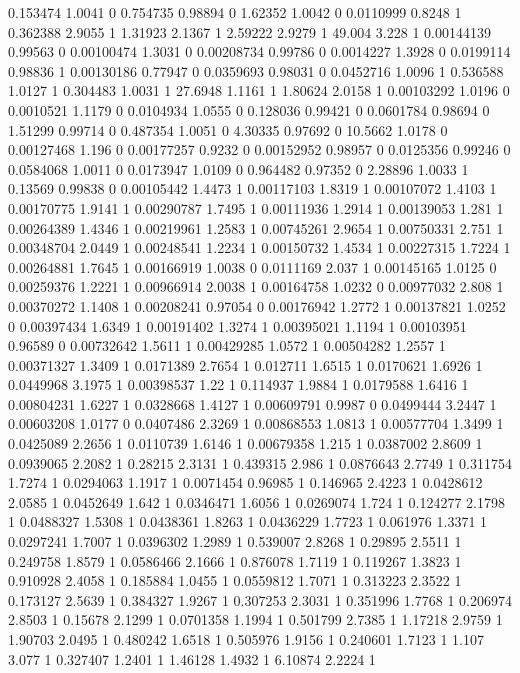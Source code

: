 {0.153474 1.0041 0
0.754735 0.98894 0
1.62352 1.0042 0
0.0110999 0.8248 1
0.362388 2.9055 1
1.31923 2.1367 1
2.59222 2.9279 1
49.004 3.228 1
0.00144139 0.99563 0
0.00100474 1.3031 0
0.00208734 0.99786 0
0.0014227 1.3928 0
0.0199114 0.98836 1
0.00130186 0.77947 0
0.0359693 0.98031 0
0.0452716 1.0096 1
0.536588 1.0127 1
0.304483 1.0031 1
27.6948 1.1161 1
1.80624 2.0158 1
0.00103292 1.0196 0
0.0010521 1.1179 0
0.0104934 1.0555 0
0.128036 0.99421 0
0.0601784 0.98694 0
1.51299 0.99714 0
0.487354 1.0051 0
4.30335 0.97692 0
10.5662 1.0178 0
0.00127468 1.196 0
0.00177257 0.9232 0
0.00152952 0.98957 0
0.0125356 0.99246 0
0.0584068 1.0011 0
0.0173947 1.0109 0
0.964482 0.97352 0
2.28896 1.0033 1
0.13569 0.99838 0
0.00105442 1.4473 1
0.00117103 1.8319 1
0.00107072 1.4103 1
0.00170775 1.9141 1
0.00290787 1.7495 1
0.00111936 1.2914 1
0.00139053 1.281 1
0.00264389 1.4346 1
0.00219961 1.2583 1
0.00745261 2.9654 1
0.00750331 2.751 1
0.00348704 2.0449 1
0.00248541 1.2234 1
0.00150732 1.4534 1
0.00227315 1.7224 1
0.00264881 1.7645 1
0.00166919 1.0038 0
0.0111169 2.037 1
0.00145165 1.0125 0
0.00259376 1.2221 1
0.00966914 2.0038 1
0.00164758 1.0232 0
0.00977032 2.808 1
0.00370272 1.1408 1
0.00208241 0.97054 0
0.00176942 1.2772 1
0.00137821 1.0252 0
0.00397434 1.6349 1
0.00191402 1.3274 1
0.00395021 1.1194 1
0.00103951 0.96589 0
0.00732642 1.5611 1
0.00429285 1.0572 1
0.00504282 1.2557 1
0.00371327 1.3409 1
0.0171389 2.7654 1
0.012711 1.6515 1
0.0170621 1.6926 1
0.0449968 3.1975 1
0.00398537 1.22 1
0.114937 1.9884 1
0.0179588 1.6416 1
0.00804231 1.6227 1
0.0328668 1.4127 1
0.00609791 0.9987 0
0.0499444 3.2447 1
0.00603208 1.0177 0
0.0407486 2.3269 1
0.00868553 1.0813 1
0.00577704 1.3499 1
0.0425089 2.2656 1
0.0110739 1.6146 1
0.00679358 1.215 1
0.0387002 2.8609 1
0.0939065 2.2082 1
0.28215 2.3131 1
0.439315 2.986 1
0.0876643 2.7749 1
0.311754 1.7274 1
0.0294063 1.1917 1
0.0071454 0.96985 1
0.146965 2.4223 1
0.0428612 2.0585 1
0.0452649 1.642 1
0.0346471 1.6056 1
0.0269074 1.724 1
0.124277 2.1798 1
0.0488327 1.5308 1
0.0438361 1.8263 1
0.0436229 1.7723 1
0.061976 1.3371 1
0.0297241 1.7007 1
0.0396302 1.2989 1
0.539007 2.8268 1
0.29895 2.5511 1
0.249758 1.8579 1
0.0586466 2.1666 1
0.876078 1.7119 1
0.119267 1.3823 1
0.910928 2.4058 1
0.185884 1.0455 1
0.0559812 1.7071 1
0.313223 2.3522 1
0.173127 2.5639 1
0.384327 1.9267 1
0.307253 2.3031 1
0.351996 1.7768 1
0.206974 2.8503 1
0.15678 2.1299 1
0.0701358 1.1994 1
0.501799 2.7385 1
1.17218 2.9759 1
1.90703 2.0495 1
0.480242 1.6518 1
0.505976 1.9156 1
0.240601 1.7123 1
1.107 3.077 1
0.327407 1.2401 1
1.46128 1.4932 1
6.10874 2.2224 1
}
